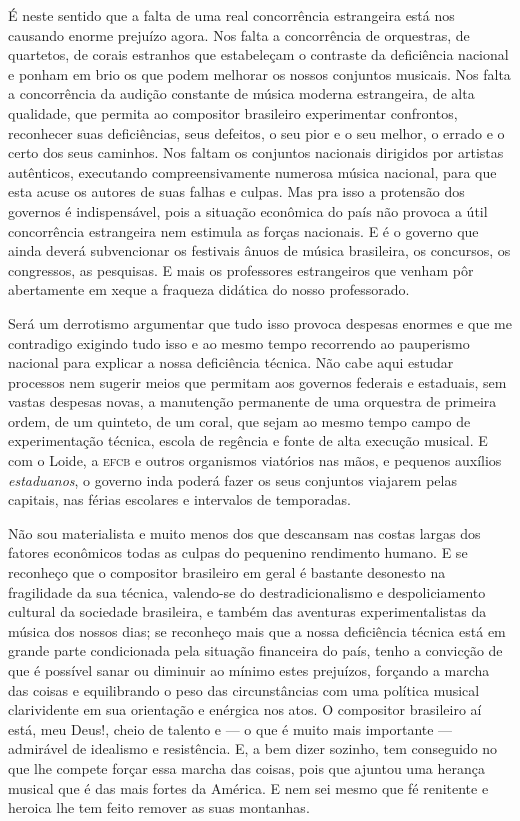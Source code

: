 É neste sentido que a falta de uma real concorrência estrangeira está
nos causando enorme prejuízo agora. Nos falta a concorrência de
orquestras, de quartetos, de corais estranhos que estabeleçam o
contraste da deficiência nacional e ponham em brio os que podem melhorar
os nossos conjuntos musicais. Nos falta a concorrência da audição
constante de música moderna estrangeira, de alta qualidade, que permita
ao compositor brasileiro experimentar confrontos, reconhecer suas
deficiências, seus defeitos, o seu pior e o seu melhor, o errado e o
certo dos seus caminhos. Nos faltam os conjuntos nacionais dirigidos por
artistas autênticos, executando compreensivamente numerosa música
nacional, para que esta acuse os autores de suas falhas e culpas. Mas
pra isso a protensão dos governos é indispensável, pois a situação
econômica do país não provoca a útil concorrência estrangeira nem
estimula as forças nacionais. E é o governo que ainda deverá
subvencionar os festivais ânuos de música brasileira, os concursos, os
congressos, as pesquisas. E mais os professores estrangeiros que venham
pôr abertamente em xeque a fraqueza didática do nosso professorado.

Será um derrotismo argumentar que tudo isso provoca despesas enormes e
que me contradigo exigindo tudo isso e ao mesmo tempo recorrendo ao
pauperismo nacional para explicar a nossa deficiência técnica. Não cabe
aqui estudar processos nem sugerir meios que permitam aos governos
federais e estaduais, sem vastas despesas novas, a manutenção permanente
de uma orquestra de primeira ordem, de um quinteto, de um coral, que
sejam ao mesmo tempo campo de experimentação técnica, escola de regência
e fonte de alta execução musical. E com o Loide, a \textsc{efcb} e outros
organismos viatórios nas mãos, e pequenos auxílios \textit{estaduanos}, o governo
inda poderá fazer os seus conjuntos viajarem pelas capitais, nas férias
escolares e intervalos de temporadas.

Não sou materialista e muito menos dos que descansam nas costas largas
dos fatores econômicos todas as culpas do pequenino rendimento humano. E
se reconheço que o compositor brasileiro em geral é bastante desonesto
na fragilidade da sua técnica, valendo-se do destradicionalismo e
despoliciamento cultural da sociedade brasileira, e também das aventuras
experimentalistas da música dos nossos dias; se reconheço mais que a
nossa deficiência técnica está em grande parte condicionada pela
situação financeira do país, tenho a convicção de que é possível sanar
ou diminuir ao mínimo estes prejuízos, forçando a marcha das coisas e
equilibrando o peso das circunstâncias com uma política musical
clarividente em sua orientação e enérgica nos atos. O compositor
brasileiro aí está, meu Deus!, cheio de talento e --- o que é muito mais
importante --- admirável de idealismo e resistência. E, a bem dizer
sozinho, tem conseguido no que lhe compete forçar essa marcha das
coisas, pois que ajuntou uma herança musical que é das mais fortes da
América. E nem sei mesmo que fé renitente e heroica lhe tem feito
remover as suas montanhas.



